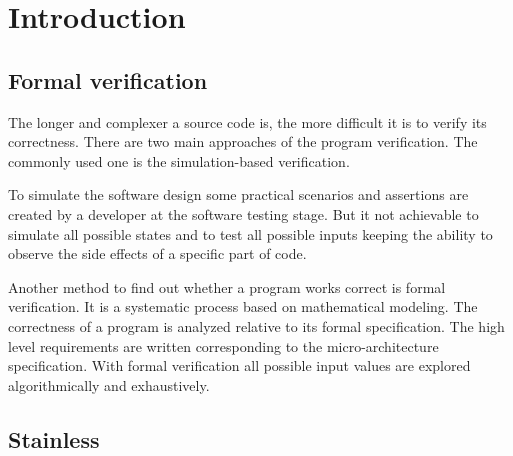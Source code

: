 \chapter{Introduction}
\label{chap:introduction}


\nocite{kopka:band1}
\nocite{raichle:bibtex_programmierung}
\nocite{MiKTeX}
\nocite{KOMA}
\nocite{TeXnicCenter}
\nocite{Marti06}
\nocite{Erbsland08}
\nocite{juergens:einfuehrung}
\nocite{juergens:fortgeschritten}

\section{Formal verification}
\label{sec:formal_verification}

The longer and complexer a source code is, the more difficult it is to verify its correctness.
There are two main approaches of the program verification. The commonly used one is the simulation-based verification.

To simulate the software design some practical scenarios and assertions are created by a developer at the software testing stage. 
But it not achievable to simulate all possible states and to test all possible inputs keeping the ability to observe the side effects of a specific part of code.

Another method to find out whether a program works correct is formal verification. It is a systematic process based on mathematical modeling.
The correctness of a program is analyzed relative to its formal specification. The high level requirements are written corresponding to the micro-architecture specification.
With formal verification all possible input values are explored algorithmically and exhaustively. \cite{sanghavi:formal_verification}




\section{Stainless}
\label{sec:stainless}


